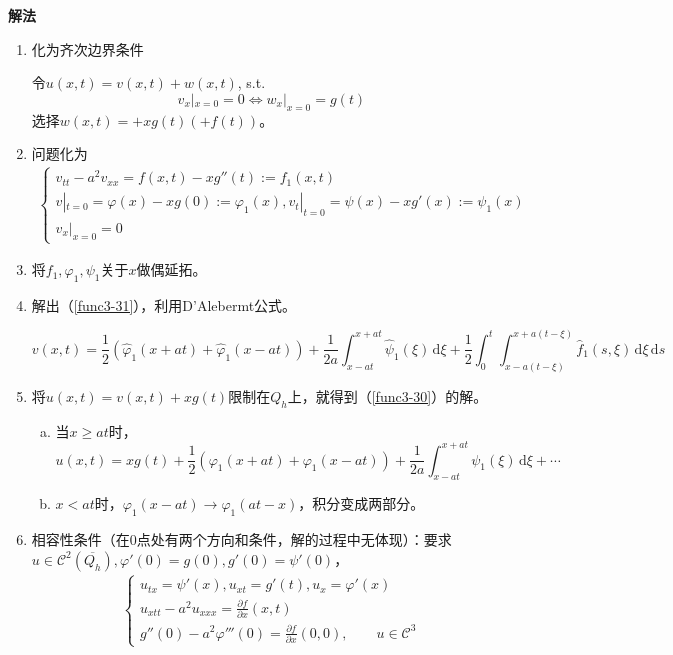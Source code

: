 \documentclass[11pt, a4paper]{article}
\theoremstyle{theorem}
\newcommand{\intd}[1]{\,\mathrm{d}{#1}}
\begin{document}
\textbf{解法}
\begin{enumerate}[(1)]
  \item 化为齐次边界条件

令$u(x,t) = v(x,t) + w(x,t)$, s.t.
$$
v_x|_{x = 0} = 0 \Longleftrightarrow w_x|_{x = 0} = g(t)
$$
选择$w(x,t) = + x g(t) ( + f(t))$。

  \item 问题化为
\begin{align}
\label{func3-31}
\begin{cases}
    v_{tt} - a^2 v_{xx} = f(x,t) - x g''(t) := f_1(x,t) \\
    v|_{t = 0} = \varphi(x) - xg(0) := \varphi_1(x), v_t|_{t = 0} = \psi(x) - xg'(x) := \psi_1(x) \\
    v_x|_{x = 0} = 0
\end{cases}
\end{align}

  \item 将$f_1, \varphi_1, \psi_1$关于$x$做偶延拓。

  \item 解出（\ref{func3-31}），利用D'Alebermt公式。

  $$
  v(x,t) = \frac{1}{2} \left(\hat{\varphi}_1(x+at) + \hat{\varphi}_1(x-at)\right) + \frac{1}{2a} \int_{x-at}^{x+at} \hat{\psi}_1(\xi) \intd \xi + \frac{1}{2} \int_0^t \int_{x - a(t - \xi)}^{x + a(t-\xi)} \hat{f}_1(s,\xi) \intd \xi \intd s
  $$

  \item 将$u(x,t) = v(x,t) + xg(t)$限制在$Q_h$上，就得到（\ref{func3-30}）的解。
  \begin{enumerate}[a)]
    \item 当$x \geq at$时，
    $$
    u(x,t) = xg(t) + \frac{1}{2} \left(\varphi_1(x+at) + \varphi_1(x-at)\right) + \frac{1}{2a} \int_{x-at}^{x+at} \psi_1(\xi) \intd \xi + \cdots
    $$
    \item $x < at$时，$\varphi_1(x-at) \longrightarrow \varphi_1(at - x)$，积分变成两部分。
  \end{enumerate}

  \item 相容性条件（在0点处有两个方向和条件，解的过程中无体现）：要求$u \in \mathcal{C}^2(\overline{Q_h}), \varphi'(0) = g(0), g'(0) = \psi'(0)$，
  \begin{align}
  \label{func3-32}
      \begin{cases}
      u_{tx} = \psi'(x), u_{xt} = g'(t), u_x = \varphi'(x) \\
      u_{xtt} - a^2 u_{xxx} = \frac{\partial f}{\partial x} (x,t) \\
      g''(0) - a^2 \varphi'''(0) = \frac{\partial f}{\partial x}(0,0), \quad \quad u \in \mathcal{C}^3
      \end{cases}
  \end{align}

\end{enumerate}
\end{document}
